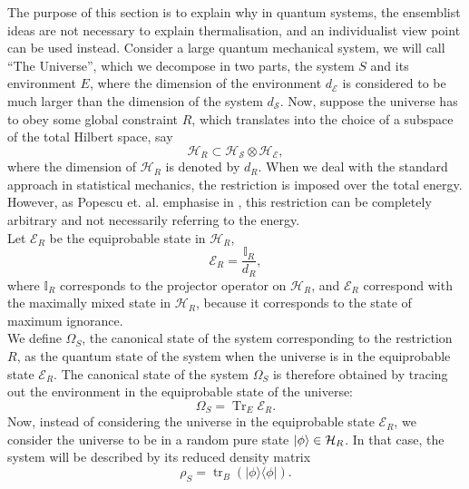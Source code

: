 The purpose of this section is to explain why in quantum systems, the ensemblist ideas are not necessary to explain thermalisation, and an individualist view point can be used instead. Consider a large quantum mechanical system, we will call ``The Universe'', which we decompose in two parts, the system $S$ and its environment $E$, where the dimension of the environment $d_{\mathcal{E}}$ is considered to be much larger than the  dimension of the system $d_{\mathcal{S}}$. Now, suppose the universe has to obey some global constraint $R$, which translates into the choice of a subspace of the total Hilbert space, say
 \begin{equation}
 \mathcal{H}_{R} \subset \mathcal{H}_{\mathcal{S}} \otimes \mathcal{H}_{\mathcal{E}},
 \label{CH1:Tipicality_1}
 \end{equation}
where the dimension of $\mathcal{H}_{R}$ is denoted  by  $d_R$. When we deal with the standard approach in statistical mechanics, the restriction is imposed over the total energy. However, as Popescu et. al. emphasise in \cite{popescu_entanglement_2006, popescu_foundations_2005}, this restriction can be completely arbitrary and not necessarily referring to the energy.\\
\indent Let $\mathcal{E}_R$ be the equiprobable state in $\mathcal{H}_{R}$,
\begin{equation}
\mathcal{E}_{R} = \frac{\mathbb{I}_R}{d_R},
\end{equation}
where $\mathbb{I}_R$ corresponds to the projector operator on $\mathcal{H}_R$, and $\mathcal{E}_R$ correspond with the maximally mixed state in $\mathcal{H}_R$, because it corresponds to the state of maximum ignorance.\\
\indent We define $\Omega_S$, the canonical state of the system corresponding to the restriction $R$, as the quantum state of the system when the universe is in the equiprobable state $\mathcal{E}_R$. The canonical state of the system $\Omega_S$ is therefore obtained by tracing out the environment in the equiprobable state of the universe:
\begin{equation}
\Omega_{S}=\operatorname{Tr}_{E} \mathcal{E}_{R}.
\label{CH1:Canonical_state}
\end{equation}
Now, instead of considering the universe in the equiprobable state $\mathcal{E}_R$, we consider the universe to be in a random pure state $\mathinner{|{\phi}\rangle}\in \mathcal{H}_R$. In that case, the system will be described by its reduced density matrix
\begin{equation}
\rho_{S}=\operatorname{tr}_{B}(|\phi\rangle\langle\phi|).
\label{CH1:Reduced_density_random_pure_state}
\end{equation}

